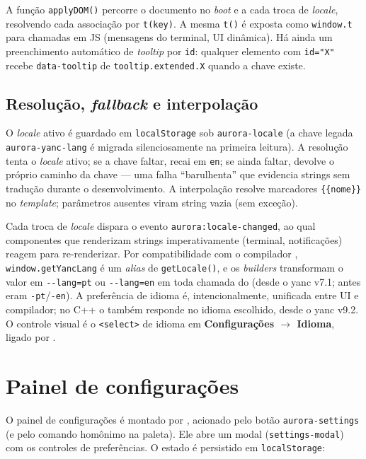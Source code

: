 A função \lstinline|applyDOM()| percorre o documento no \textit{boot} e a cada
troca de \textit{locale}, resolvendo cada associação por \lstinline|t(key)|. A
mesma \lstinline|t()| é exposta como \lstinline|window.t| para chamadas em JS
(mensagens do terminal, UI dinâmica). Há ainda um preenchimento automático de
\textit{tooltip} por \lstinline|id|: qualquer elemento com \lstinline|id="X"|
recebe \lstinline|data-tooltip| de \lstinline|tooltip.extended.X| quando a chave
existe.

\subsection{Resolução, \textit{fallback} e interpolação}

O \textit{locale} ativo é guardado em \lstinline|localStorage| sob
\lstinline|aurora-locale| (a chave legada \lstinline|aurora-yanc-lang| é migrada
silenciosamente na primeira leitura). A resolução tenta o \textit{locale} ativo;
se a chave faltar, recai em \lstinline|en|; se ainda faltar, devolve o próprio
caminho da chave — uma falha \enquote{barulhenta} que evidencia strings sem
tradução durante o desenvolvimento. A interpolação resolve marcadores
\lstinline|{{nome}}| no \textit{template}; parâmetros ausentes viram string
vazia (sem exceção).

Cada troca de \textit{locale} dispara o evento
\lstinline|aurora:locale-changed|, ao qual componentes que renderizam strings
imperativamente (terminal, notificações) reagem para re-renderizar. Por
compatibilidade com o compilador , \lstinline|window.getYancLang| é
um \textit{alias} de \lstinline|getLocale()|, e os \textit{builders} transformam o
valor em \lstinline|--lang=pt| ou \lstinline|--lang=en| em toda chamada do
 (desde o yanc v7.1; antes eram \lstinline|-pt|/\lstinline|-en|). A
preferência de idioma é, intencionalmente, unificada entre UI e compilador; no
C++ o  também responde no idioma escolhido, desde o yanc v9.2. O
controle visual é o \lstinline|<select>| de idioma em
\textbf{Configurações $\rightarrow$ Idioma}, ligado por
.

\section{Painel de configurações}
\label{sec:13-config}

O painel de configurações é montado por ,
acionado pelo botão \lstinline|aurora-settings| (e pelo comando homônimo na
paleta). Ele abre um modal (\lstinline|settings-modal|) com os controles de
preferências. O estado é persistido em \lstinline|localStorage|:


